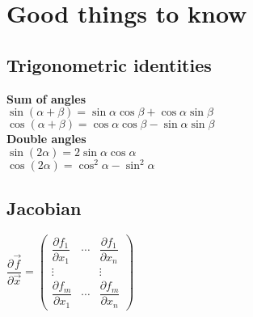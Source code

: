 \section{Good things to know}
\subsection*{Trigonometric identities}
\textbf{Sum of angles}\\
$\sin(\alpha + \beta) = \sin \alpha \cos \beta + \cos \alpha \sin
\beta$\\
$\cos(\alpha + \beta) = \cos \alpha \cos \beta - \sin \alpha \sin
\beta$\\
\textbf{Double angles}\\
$\sin(2 \alpha) = 2 \sin \alpha \cos \alpha$\\
$\cos(2 \alpha) = \cos^2 \alpha - \sin^2 \alpha$

\subsection*{Jacobian}
$ \dfrac{\partial \vec{f}}{\partial{\vec{x}}}
=
\begin{pmatrix}
  \dfrac{\partial {f_1}}{\partial{x_1}} &
  \cdots &
  \dfrac{\partial {f_1}}{\partial{x_n}}\\
  \vdots & & \vdots \\
  \dfrac{\partial {f_m}}{\partial{x_1}} &
  \cdots &
  \dfrac{\partial {f_m}}{\partial{x_n}}
\end{pmatrix}
$\\
